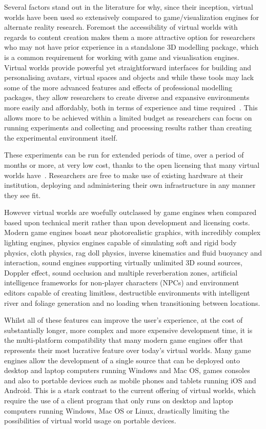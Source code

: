 Several factors stand out in the literature for why, since their inception, virtual worlds have been used so extensively compared to game/visualization engines for alternate reality research. Foremost the accessibility of virtual worlds with regards to content creation makes them a more attractive option for researchers who may not have prior experience in a standalone 3D modelling package, which is a common requirement for working with game and visualisation engines. Virtual worlds provide powerful yet straightforward interfaces for building and personalising avatars, virtual spaces and objects and while these tools may lack some of the more advanced features and effects of professional modelling packages, they allow researchers to create diverse and expansive environments more easily and affordably, both in terms of experience and time required~\cite{Hendaoui2008}. This allows more to be achieved within a limited budget as researchers can focus on running experiments and collecting and processing results rather than creating the experimental environment itself.

These experiments can be run for extended periods of time, over a period of months or more, at very low cost, thanks to the open licensing that many virtual worlds have~\cite{Bainbridge2007}. Researchers are free to make use of existing hardware at their institution, deploying and administering their own infrastructure in any manner they see fit.

However virtual worlds are woefully outclassed by game engines when compared based upon technical merit rather than upon development and licensing costs. Modern game engines  boast near photorealistic graphics, with incredibly complex lighting engines, physics engines capable of simulating soft and rigid body physics, cloth physics, rag doll physics, inverse kinematics and fluid buoyancy and interaction, sound engines supporting virtually unlimited 3D sound sources, Doppler effect, sound occlusion and multiple reverberation zones, artificial intelligence frameworks for non-player characters (NPCs) and environment editors capable of creating limitless, destructible environments with intelligent river and foliage generation and no loading when transitioning between locations.

Whilst all of these features can improve the user's experience, at the cost of substantially longer, more complex and more expensive development time, it is the multi-platform compatibility that many modern game engines offer that represents their most lucrative feature over today's virtual worlds. Many game engines allow the development of a single source that can be deployed onto desktop and laptop computers running Windows and Mac OS, games consoles and also to portable devices such as mobile phones and tablets running iOS and Android. This is a stark contrast to the current offering of virtual worlds, which require the use of a client program that only runs on desktop and laptop computers running Windows, Mac OS or Linux, drastically limiting the possibilities of virtual world usage on portable devices.

